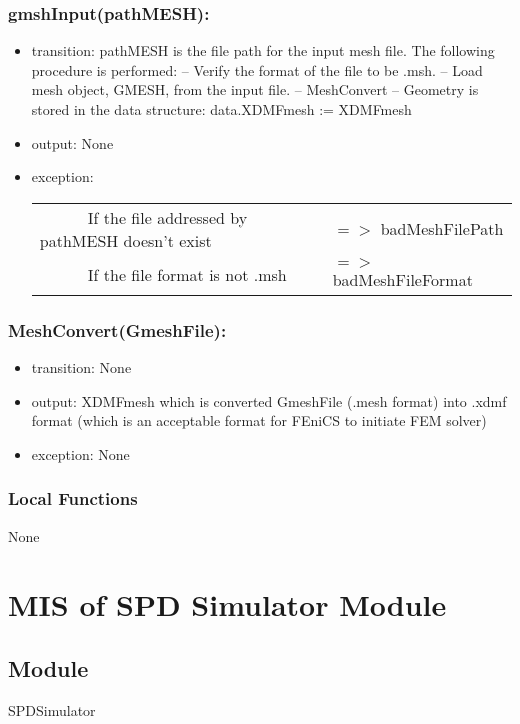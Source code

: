 \documentclass[12pt, titlepage]{article}
\begin{document}
\subsubsection*{gmshInput(pathMESH):}
\begin{itemize}
	\item transition: pathMESH is the file path for the input mesh file. The following procedure is performed:
	\subitem -- Verify the format of the file to be .msh.
	\subitem -- Load mesh object, GMESH, from the input file. 
	\subitem -- MeshConvert
	\subitem -- Geometry is stored in the data structure: data.XDMFmesh := XDMFmesh
	
	\item output: None
	\item exception: 
		\noindent \begin{longtable*}[l]{l l}
		\ \ \ \ \ \ If the file addressed by pathMESH doesn't exist & $=>$ badMeshFilePath\\
		\ \ \ \ \ \ If the file format is not .msh & $=>$ badMeshFileFormat\\
	\end{longtable*}

	 
\end{itemize}


\subsubsection*{MeshConvert(GmeshFile):}
\begin{itemize}
	\item transition: None
	\item output: XDMFmesh which is converted GmeshFile (.mesh format) into .xdmf format (which is an acceptable format for FEniCS to initiate FEM solver) 
	\item exception: None
\end{itemize}


\subsubsection{Local Functions}

None
\newpage
%
%
%
%
\section{MIS of SPD Simulator Module} \label{SSM} 
 

\subsection{Module}
SPDSimulator
\end{document}
